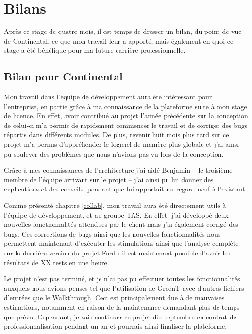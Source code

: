 \chapter{Bilans}
\putminitoc

Après ce stage de quatre mois, il est temps de dresser un bilan, du point de vue de Continental, ce que mon travail leur a apporté, mais également en quoi ce stage a été bénéfique pour ma future carrière professionnelle.

\section{Bilan pour Continental}
Mon travail dans l'équipe de développement aura été intéressant pour l'entreprise, en partie grâce à ma connaissance de la plateforme suite à mon stage de licence. En effet, avoir contribué au projet l'année précédente sur la conception de celui-ci m'a permis de rapidement commencer le travail et de corriger des bugs répartis dans différents modules. De plus, revenir huit mois plus tard sur ce projet m'a permis d'appréhender le logiciel de manière plus globale et j'ai ainsi pu soulever des problèmes que nous n'avions pas vu lors de la conception.

Grâce à mes connaissances de l'architecture j'ai aidé Benjamin  -- le troisième membre de l'équipe arrivant sur le projet -- j'ai ainsi pu lui donner des explications et des conseils, pendant que lui apportait un regard neuf à l'existant.

Comme présenté chapitre \ref{collab}, mon travail aura été directement utile à l'équipe de développement, et au groupe TAS. En effet, j'ai développé deux nouvelles fonctionnalités attendues par le client mais j'ai également corrigé des bugs. Ces corrections de bugs ainsi que les nouvelles fonctionnalités nous permettent maintenant d'exécuter les stimulations ainsi que l'analyse complète sur la dernière version du projet Ford : il est maintenant possible d'avoir les résultats de XX tests en une heure.

Le projet n'est pas terminé, et je n'ai pas pu effectuer toutes les fonctionnalités auxquels nous avions pensés tel que l'utilisation de GreenT avec d'autres fichiers d'entrées que le Walkthrough. Ceci est principalement due à de mauvaises estimations, notamment en raison de la maintenance demandant plus de temps que prévu. Cependant, je vais continuer ce projet dès septembre en contrat de professionnalisation pendant un an et pourrais ainsi finaliser la plateforme.

